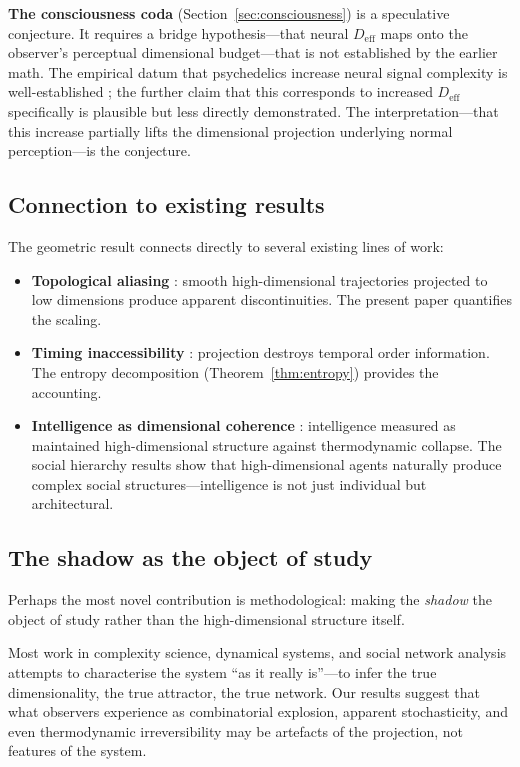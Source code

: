 \documentclass[12pt,a4paper]{article}
\begin{document}
\textbf{The consciousness coda} (Section~\ref{sec:consciousness}) is a speculative conjecture.
It requires a bridge hypothesis---that neural $D_{\mathrm{eff}}$ maps onto the observer's perceptual dimensional budget---that is not established by the earlier math.
The empirical datum that psychedelics increase neural signal complexity is well-established \citep{schartner2017,carhart-harris2014}; the further claim that this corresponds to increased $D_{\mathrm{eff}}$ specifically is plausible but less directly demonstrated.
The interpretation---that this increase partially lifts the dimensional projection underlying normal perception---is the conjecture.

\subsection{Connection to existing results}

The geometric result connects directly to several existing lines of work:
\begin{itemize}
\item \textbf{Topological aliasing} \citep{todd2025falsifiability}: smooth high-dimensional trajectories projected to low dimensions produce apparent discontinuities.
The present paper quantifies the scaling.

\item \textbf{Timing inaccessibility} \citep{todd2025timing}: projection destroys temporal order information.
The entropy decomposition (Theorem~\ref{thm:entropy}) provides the accounting.

\item \textbf{Intelligence as dimensional coherence} \citep{todd2026intelligence}: intelligence measured as maintained high-dimensional structure against thermodynamic collapse.
The social hierarchy results show that high-dimensional agents naturally produce complex social structures---intelligence is not just individual but architectural.
\end{itemize}

\subsection{The shadow as the object of study}

Perhaps the most novel contribution is methodological: making the \emph{shadow} the object of study rather than the high-dimensional structure itself.

Most work in complexity science, dynamical systems, and social network analysis attempts to characterise the system ``as it really is''---to infer the true dimensionality, the true attractor, the true network.
Our results suggest that what observers experience as combinatorial explosion, apparent stochasticity, and even thermodynamic irreversibility may be artefacts of the projection, not features of the system.
\end{document}
